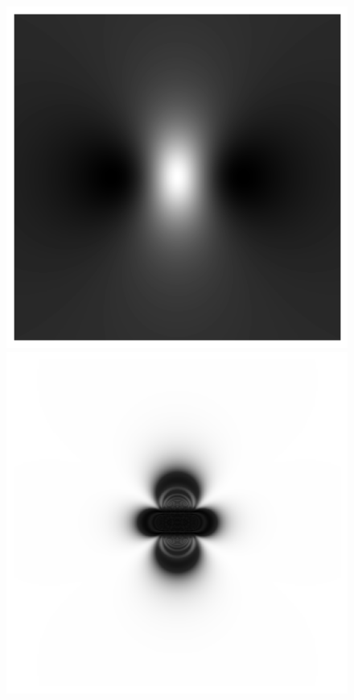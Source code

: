 \documentclass[conference]{IEEEtran}
\begin{document}
\begin{figure}[h]
    \centering
    \begin{minipage}{0.241\textwidth}
        \centering
        \includegraphics[width=\textwidth, angle=90]{Conference/img/dipole-field-distortion.png}
    \end{minipage}\hfill \hspace*{0cm}
    \begin{minipage}{0.241\textwidth}
        \centering
        \includegraphics[width=\textwidth]{Conference/img/coronal-magnitude-simulation.png}

\end{minipage}
\end{figure}
\end{document}
